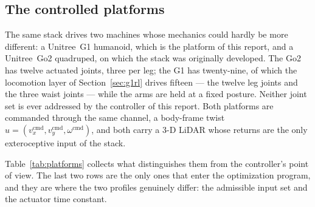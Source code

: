 \documentclass[11pt,a4paper]{article}
\begin{document}
\subsection{The controlled platforms}
\label{sec:platforms}

The same stack drives two machines whose mechanics could hardly be more different: a Unitree~G1 humanoid,
which is the platform of this report, and a Unitree~Go2 quadruped, on which the stack was originally
developed. The Go2 has twelve actuated joints, three per leg; the G1 has twenty-nine, of which the locomotion
layer of Section~\ref{sec:g1rl} drives fifteen --- the twelve leg joints and the three waist joints --- while
the arms are held at a fixed posture. Neither joint set is ever addressed by the controller of this report.
Both platforms are commanded through the same channel, a body-frame twist
$u=(v_x^{\mathrm{cmd}},v_y^{\mathrm{cmd}},\omega^{\mathrm{cmd}})$, and both carry a 3-D LiDAR whose returns
are the only exteroceptive input of the stack.

Table~\ref{tab:platforms} collects what distinguishes them from the controller's point of view. The last two
rows are the only ones that enter the optimization program, and they are where the two profiles genuinely
differ: the admissible input set and the actuator time constant.
\end{document}
